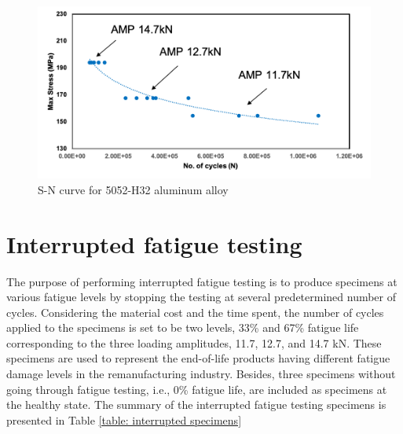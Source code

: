 \begin{figure}[tb]
  \includegraphics[width=\linewidth]{fig/sn_curve.png}
  \caption{S-N curve for 5052-H32 aluminum alloy}
  \label{fig: raw sn curve}
\end{figure}

\section{Interrupted fatigue testing}
The purpose of performing interrupted fatigue testing is to produce specimens at various fatigue levels by stopping the testing at several predetermined number of cycles. Considering the material cost and the time spent, the number of cycles applied to the specimens is set to be two levels, 33\% and 67\% fatigue life corresponding to the three loading amplitudes, 11.7, 12.7, and 14.7 kN. These specimens are used to represent the end-of-life products having different fatigue damage levels in the remanufacturing industry. Besides, three specimens without going through fatigue testing, i.e., 0\% fatigue life, are included as specimens at the healthy state. The summary of the interrupted fatigue testing specimens is presented in Table \ref{table: interrupted specimens}

